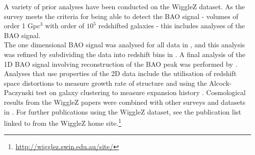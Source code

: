 \documentclass[titlesmallcaps, examinerscopy, copyrightpage]{uqthesis}
\begin{document}
A variety of prior analyses have been conducted on the WiggleZ dataset. As the survey meets the criteria for being able to detect the BAO signal - volumes of order 1 Gpc$^3$ with order of $10^5$ redshifted galaxies \citep{Tegmark1997,BlakeGlazebrook2003,BlakeParkinson2006} - this includes analyses of the BAO signal.\\


The one dimensional BAO signal was analysed for all data in \citet{BlakeDavis2011}, and this analysis was refined by subdividing the data into redshift bins in \citet{BlakeKazin2011}. A final analysis of the 1D BAO signal involving reconstruction of the BAO peak was performed by \citet{KazinKoda2014}. Analyses that use properties of the 2D data include the utilisation of redshift space distortions to measure growth rate of structure \citep{BlakeBroughColless2011,ContrerasBlake2013} and using the Alcock-Paczynski test on galaxy clustering to measure expansion history \citep{BlakeGlazebrook2011}. Cosmological results from the WiggleZ papers were combined with other surveys and datasets in \citet{Parkinson2012}. For further publications using the WiggleZ dataset, see the publication list linked to from the WiggleZ home site.\footnote{\url{http://wigglez.swin.edu.au/site/}}\\

\end{document}
